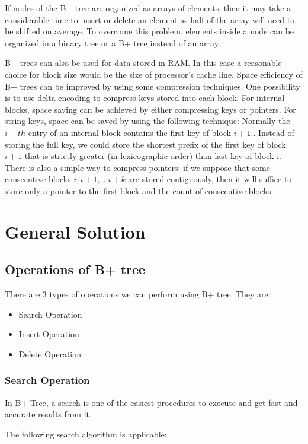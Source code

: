 \documentclass[11pt, a4paper]{article}
\begin{document}
\noindent If nodes of the B+ tree are organized as arrays of elements, then it may take a considerable time to insert or delete an element as half of the array will need to be shifted on average. To overcome this problem, elements inside a node can be organized in a binary tree or a B+ tree instead of an array.

\noindent B+ trees can also be used for data stored in RAM. In this case a reasonable choice for block size would be the size of processor's cache line.
\noindent Space efficiency of B+ trees can be improved by using some compression techniques. One possibility is to use delta encoding to compress keys stored into each block. For internal blocks, space saving can be achieved by either compressing keys or pointers. For string keys, space can be saved by using the following technique: Normally the $i-th$ entry of an internal block contains the first key of block $i+1$.. Instead of storing the full key, we could store the shortest prefix of the first key of block $i+1$ that is strictly greater (in lexicographic order) than last key of block i. There is also a simple way to compress pointers: if we suppose that some consecutive blocks $ i,i+1,...i+k$ are stored contiguously, then it will suffice to store only a pointer to the first block and the count of consecutive blocks

\section{General Solution}

\subsection{Operations of B+ tree}
There are 3 types of operations we can perform using B+ tree. They are:
\begin{itemize}
    \item Search Operation
    \item Insert Operation
    \item Delete Operation
\end{itemize}

\subsubsection{Search Operation}
In B+ Tree, a search is one of the easiest procedures to execute and get fast and accurate results from it.

The following search algorithm is applicable:
\end{document}
